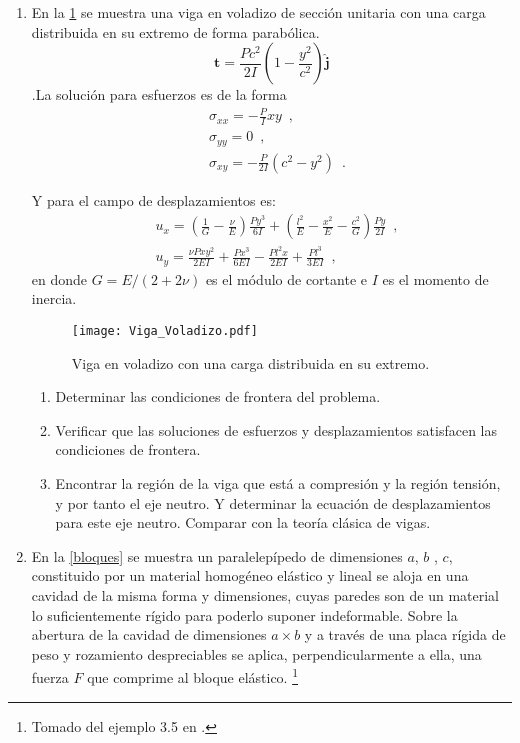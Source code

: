\documentclass[../notas medios.tex]{subfiles}
\begin{document}
\begin{enumerate}
\item \label{punto04_m} En la \cref{fig:viga} se muestra una viga en voladizo de sección unitaria con una carga distribuida en su extremo de forma parabólica.
\[\mathbf{t} = \frac{Pc^2}{2I}\left(1-\frac{y^2}{c^2}\right)\hat{\mathbf{j}}\].La solución para esfuerzos es de la forma
\begin{align*}
&\sigma_{xx} = -\frac{P}{I}xy \enspace ,\\
&\sigma_{yy} = 0 \enspace ,\\
&\sigma_{xy} = -\frac{P}{2I}(c^2 - y^2) \enspace .
\end{align*}

Y para el campo de desplazamientos es:
\begin{align*}
&u_{x} = \left(\frac{1}{G} - \frac{\nu}{E}\right)\frac{Py^3}{6I} + \left(\frac{l^2}{E} - \frac{x^2}{E} - \frac{c^2}{G} \right)\frac{Py}{2I} \enspace ,\\
&u_{y} = \frac{\nu P xy^2}{2EI} + \frac{Px^3}{6EI} - \frac{Pl^2x}{2EI} + \frac{Pl^3}{3EI} \enspace ,
\end{align*}
en donde $G=E/(2 + 2\nu)$ es el módulo de cortante e $I$ es el momento de inercia.
\begin{figure}[h]
	\centering
	\texttt{[image: Viga\_Voladizo.pdf]}
	\caption{Viga en voladizo con una carga distribuida en su extremo.}
	\label{fig:viga}
\end{figure}

\begin{enumerate}
\item Determinar las condiciones de frontera del problema.
\item Verificar que las soluciones de esfuerzos y desplazamientos satisfacen las condiciones de frontera.
\item Encontrar la región de la viga que está a compresión y la región tensión, y por tanto el eje neutro. Y determinar la ecuación de desplazamientos para este eje neutro. Comparar con la teoría clásica de vigas.
\end{enumerate}

\item \label{punto05_m} En la  \cref{bloques} se muestra un paralelepípedo de dimensiones $a$, $b$ , $c$, constituido por un material homogéneo elástico y lineal se aloja en una cavidad de la misma forma y dimensiones, cuyas paredes son de un material lo suficientemente rígido para poderlo suponer indeformable.
Sobre la abertura de la cavidad de dimensiones $a\times b$ y a través de una placa rígida de peso y rozamiento despreciables se aplica, perpendicularmente a ella, una fuerza $F$ que comprime al bloque elástico. \footnote{Tomado del ejemplo 3.5 en \cite{book:problemas_resueltos}.}


\end{enumerate}
\end{document}

